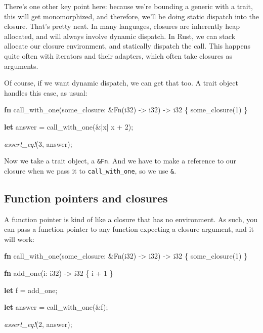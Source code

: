 \documentclass[a4paper,]{book}
\newenvironment{Shaded}{\begin{snugshade}}{\end{snugshade}}
\newcommand{\KeywordTok}[1]{\textcolor[rgb]{0.13,0.29,0.53}{\textbf{{#1}}}}
\newcommand{\DataTypeTok}[1]{\textcolor[rgb]{0.13,0.29,0.53}{{#1}}}
\newcommand{\DecValTok}[1]{\textcolor[rgb]{0.00,0.00,0.81}{{#1}}}
\newcommand{\BuiltInTok}[1]{{#1}}
\newcommand{\PreprocessorTok}[1]{\textcolor[rgb]{0.56,0.35,0.01}{\textit{{#1}}}}
\newcommand{\NormalTok}[1]{{#1}}
\begin{document}
There's one other key point here: because we're bounding a generic with
a trait, this will get monomorphized, and therefore, we'll be doing
static dispatch into the closure. That's pretty neat. In many languages,
closures are inherently heap allocated, and will always involve dynamic
dispatch. In Rust, we can stack allocate our closure environment, and
statically dispatch the call. This happens quite often with iterators
and their adapters, which often take closures as arguments.

Of course, if we want dynamic dispatch, we can get that too. A trait
object handles this case, as usual:

\begin{Shaded}
\begin{Highlighting}[]
\KeywordTok{fn} \NormalTok{call_with_one(some_closure: &}\BuiltInTok{Fn}\NormalTok{(}\DataTypeTok{i32}\NormalTok{) -> }\DataTypeTok{i32}\NormalTok{) -> }\DataTypeTok{i32} \NormalTok{\{}
    \NormalTok{some_closure(}\DecValTok{1}\NormalTok{)}
\NormalTok{\}}

\KeywordTok{let} \NormalTok{answer = call_with_one(&|x| x + }\DecValTok{2}\NormalTok{);}

\PreprocessorTok{assert_eq!}\NormalTok{(}\DecValTok{3}\NormalTok{, answer);}
\end{Highlighting}
\end{Shaded}

Now we take a trait object, a \texttt{\&Fn}. And we have to make a
reference to our closure when we pass it to \texttt{call\_with\_one}, so
we use \texttt{\&\textbar{}\textbar{}}.

\subsection{Function pointers and
closures}\label{function-pointers-and-closures}

A function pointer is kind of like a closure that has no environment. As
such, you can pass a function pointer to any function expecting a
closure argument, and it will work:

\begin{Shaded}
\begin{Highlighting}[]
\KeywordTok{fn} \NormalTok{call_with_one(some_closure: &}\BuiltInTok{Fn}\NormalTok{(}\DataTypeTok{i32}\NormalTok{) -> }\DataTypeTok{i32}\NormalTok{) -> }\DataTypeTok{i32} \NormalTok{\{}
    \NormalTok{some_closure(}\DecValTok{1}\NormalTok{)}
\NormalTok{\}}

\KeywordTok{fn} \NormalTok{add_one(i: }\DataTypeTok{i32}\NormalTok{) -> }\DataTypeTok{i32} \NormalTok{\{}
    \NormalTok{i + }\DecValTok{1}
\NormalTok{\}}

\KeywordTok{let} \NormalTok{f = add_one;}

\KeywordTok{let} \NormalTok{answer = call_with_one(&f);}

\PreprocessorTok{assert_eq!}\NormalTok{(}\DecValTok{2}\NormalTok{, answer);}
\end{Highlighting}
\end{Shaded}
\end{document}
